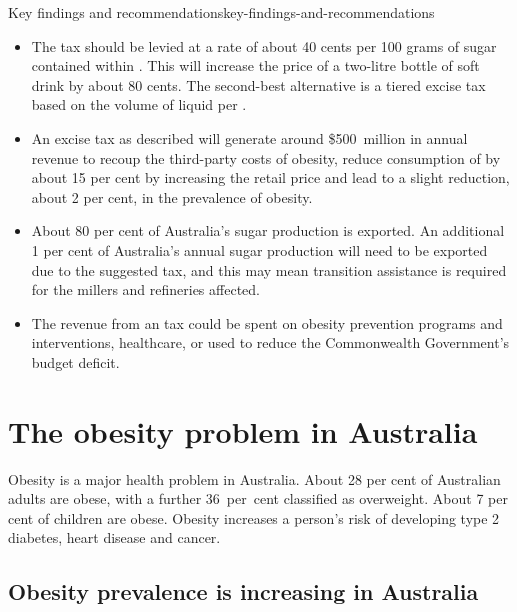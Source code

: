 \documentclass[embargoed]{grattan}
\begin{document}
\begin{bigboxreco}{Key findings and recommendations}{key-findings-and-recommendations}
\begin{itemize}
\item
  The \SSB{} tax should be levied at a rate of about 40 cents per 100 grams of sugar contained within \SSBs{}.
This will increase the price of a two-litre bottle of soft drink by about 80 cents. The second-best alternative is a tiered excise tax based on the volume of liquid per \SSB{}.
\item
  An \SSB{} excise tax as described will generate around \$500~million in annual revenue to recoup the third-party costs of obesity, reduce consumption of \SSBs{} by about 15 per cent by increasing the retail price and lead to a slight reduction, about 2 per cent, in the prevalence of obesity.
\item
   About 80 per cent of Australia's sugar production is exported.
An additional 1 per cent of Australia's annual sugar production will need to be exported due to the suggested \SSB{} tax, and this may mean transition assistance is required for the millers and refineries affected.
\item
  The revenue from an \SSB{} tax could be spent on obesity prevention programs and interventions, healthcare, or used to reduce the Commonwealth Government's budget deficit.
\end{itemize}
\end{bigboxreco}

\contentspage

\listoffigures
\listoftables

\chapter{The obesity problem in Australia}\label{the-obesity-problem-in-australia}

Obesity is a major health problem in Australia.
About 28 per cent of Australian adults are obese, with a further 36~per~cent classified as overweight.
About 7 per cent of children are obese.
Obesity increases a person's risk of developing type 2 diabetes, heart disease and cancer.

\section{Obesity prevalence is increasing in Australia }\label{obesity-prevalence-is-increasing-in-australia}
\end{document}
